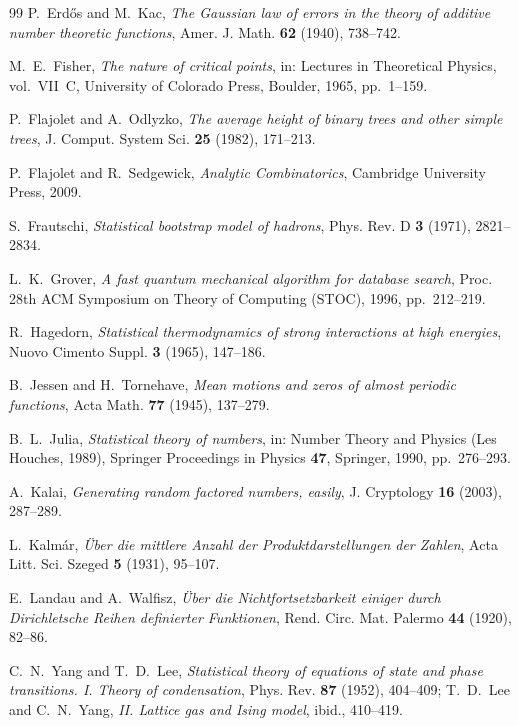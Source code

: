 \documentclass[11pt]{article}
\numberwithin{equation}{section}
\theoremstyle{plain}
\theoremstyle{definition}
\theoremstyle{remark}
\begin{document}
\begin{thebibliography}{99}
P.~Erd\H{o}s and M.~Kac,
\emph{The Gaussian law of errors in the theory of additive number theoretic
functions},
Amer. J. Math. \textbf{62} (1940), 738--742.

M.~E.~Fisher,
\emph{The nature of critical points},
in: Lectures in Theoretical Physics, vol.~VII~C,
University of Colorado Press, Boulder, 1965, pp.~1--159.

P.~Flajolet and A.~Odlyzko,
\emph{The average height of binary trees and other simple trees},
J. Comput. System Sci. \textbf{25} (1982), 171--213.

P.~Flajolet and R.~Sedgewick,
\emph{Analytic Combinatorics},
Cambridge University Press, 2009.

S.~Frautschi,
\emph{Statistical bootstrap model of hadrons},
Phys. Rev. D \textbf{3} (1971), 2821--2834.

L.~K.~Grover,
\emph{A fast quantum mechanical algorithm for database search},
Proc. 28th ACM Symposium on Theory of Computing (STOC), 1996, pp.~212--219.

R.~Hagedorn,
\emph{Statistical thermodynamics of strong interactions at high energies},
Nuovo Cimento Suppl. \textbf{3} (1965), 147--186.

B.~Jessen and H.~Tornehave,
\emph{Mean motions and zeros of almost periodic functions},
Acta Math. \textbf{77} (1945), 137--279.

B.~L.~Julia,
\emph{Statistical theory of numbers},
in: Number Theory and Physics (Les Houches, 1989), Springer Proceedings in Physics
\textbf{47}, Springer, 1990, pp.~276--293.

A.~Kalai,
\emph{Generating random factored numbers, easily},
J. Cryptology \textbf{16} (2003), 287--289.

L.~Kalm\'ar,
\emph{\"Uber die mittlere Anzahl der Produktdarstellungen der Zahlen},
Acta Litt. Sci. Szeged \textbf{5} (1931), 95--107.

E.~Landau and A.~Walfisz,
\emph{\"Uber die Nichtfortsetzbarkeit einiger durch Dirichletsche Reihen definierter
Funktionen},
Rend. Circ. Mat. Palermo \textbf{44} (1920), 82--86.

C.~N.~Yang and T.~D.~Lee,
\emph{Statistical theory of equations of state and phase transitions. I. Theory of
condensation}, Phys. Rev. \textbf{87} (1952), 404--409;
T.~D.~Lee and C.~N.~Yang, \emph{II. Lattice gas and Ising model}, ibid., 410--419.


\end{thebibliography}
\end{document}
